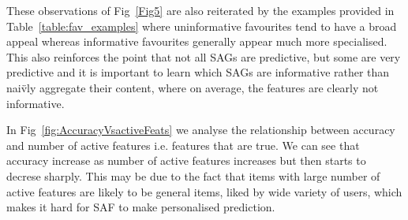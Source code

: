     These observations of Fig~\ref{Fig5} are also reiterated by the
    examples provided in Table~\ref{table:fav_examples} where uninformative favourites
    tend to have a broad appeal whereas informative favourites generally appear much
    more specialised.  This also reinforces the point that not all SAGs are predictive,
    but some are very predictive and it is important to learn which SAGs are informative
    rather than nai\"{v}ly aggregate their content, where on average, the features are
    clearly not informative.
   
    In Fig~\ref{fig:AccuracyVsactiveFeats} we analyse the relationship between accuracy and
    number of active features i.e. features that are true. We can see that accuracy increase as number of
    active features increases but then starts to decrese sharply. This may be due to the fact that items
    with large number of active features are likely to be general items, liked by wide variety of users,
    which makes it hard for SAF to make personalised prediction. 

%


